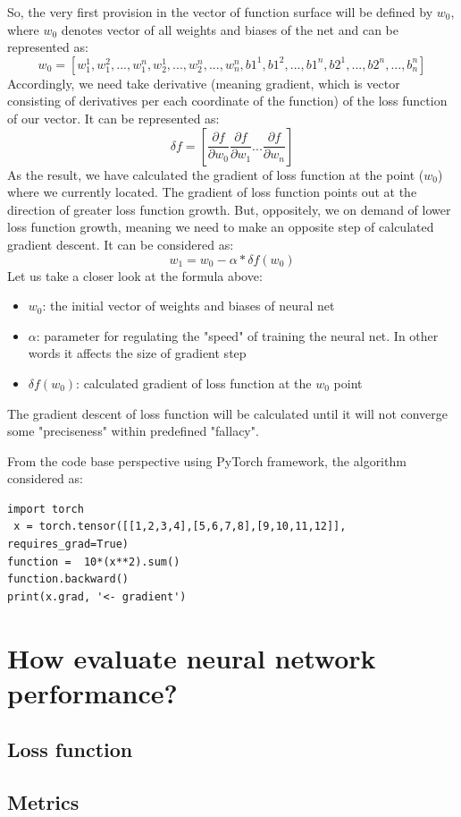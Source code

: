 So, the very first provision in the vector of function surface will be defined by $w_0$, where $w_0$ denotes vector of all weights and biases of the net and can be represented as: 
\[ w_0 = [w_1^1, w_1^2,...,w_1^n, w_2^1,...,w_2^n,...,w_n^n, b1^1, b1^2,...,b1^n, b2^1,...,b2^n,...,b_n^n] \]
Accordingly, we need take derivative (meaning gradient, which is vector consisting of derivatives per each coordinate of the function) of the loss function of our vector. It can be represented as:
\[ \delta{f} = [\frac{\partial{f}}{\partial{w_0}} \frac{\partial{f}}{\partial{w_1}} ... \frac{\partial{f}}{\partial{w_n}} ] \]
As the result, we have calculated the gradient of loss function at the point ($w_0$) where we currently located. The gradient of loss function points out at the direction of greater loss function growth. But, oppositely, we on demand of lower loss function growth, meaning we need to make an opposite step of calculated gradient descent. It can be considered as:
\[ w_1 = w_0 - \alpha*\delta{f(w_0)} \]
Let us take a closer look at the formula above:
\begin{itemize}
    \item $w_0$: the initial vector of weights and biases of neural net
    \item $\alpha$: parameter for regulating the "speed" of training the neural net. In other words it affects the size of gradient step 
    \item $\delta{f(w_0)}$: calculated gradient of loss function at the $w_0$ point 
\end{itemize}
The gradient descent of loss function will be calculated until it will not converge some "preciseness" within predefined "fallacy".


From the code base perspective using PyTorch framework, the algorithm considered as:
\begin{lstlisting}
import torch
 x = torch.tensor([[1,2,3,4],[5,6,7,8],[9,10,11,12]],                requires_grad=True) 
function =  10*(x**2).sum()
function.backward()
print(x.grad, '<- gradient')
\end{lstlisting}

\section{How evaluate neural network performance?}
\subsection{Loss function}
\subsection{Metrics}

